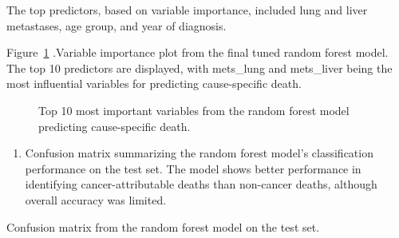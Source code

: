 \documentclass[
  letterpaper,
  DIV=11,
  numbers=noendperiod]{scrartcl}
\providecommand{\tightlist}{%
  \setlength{\itemsep}{0pt}\setlength{\parskip}{0pt}}\usepackage{longtable,booktabs,array}
\begin{document}
The top predictors, based on variable importance, included lung and
liver metastases, age group, and year of diagnosis.

Figure~\ref{fig-vip-rf} .Variable importance plot from the final tuned
random forest model. The top 10 predictors are displayed, with
mets\_lung and mets\_liver being the most influential variables for
predicting cause-specific death.

\begin{figure}


\caption{\label{fig-vip-rf}Top 10 most important variables from the
random forest model predicting cause-specific death.}

\end{figure}%

\begin{enumerate}
\def\labelenumi{\arabic{enumi}.}
\setcounter{enumi}{2}
\tightlist
\item
  Confusion matrix summarizing the random forest model's classification
  performance on the test set. The model shows better performance in
  identifying cancer-attributable deaths than non-cancer deaths,
  although overall accuracy was limited.
\end{enumerate}

\begin{table}

\caption{\label{tbl-rf-cm}Confusion matrix from the random forest model
on the test set.}


\end{table}%
\end{document}
